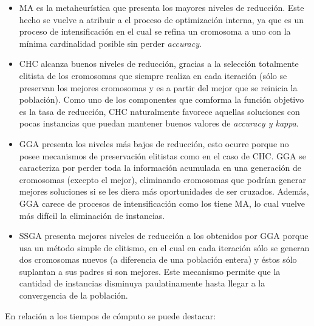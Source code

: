 \begin{itemize}

\item MA es la metaheurística que presenta los mayores niveles de reducción. Este hecho se vuelve a atribuir a el proceso de optimización interna, ya que es un proceso de intensificación en el cual se refina un cromosoma a uno con la mínima cardinalidad posible sin perder \emph{accuracy}.

\item CHC alcanza buenos niveles de reducción, gracias a la selección totalmente elitista de los cromosomas que siempre realiza en cada iteración (sólo se preservan los mejores cromosomas y es a partir del mejor que se reinicia la población). Como uno de los componentes que comforma la función objetivo es la tasa de reducción, CHC naturalmente favorece aquellas soluciones con pocas instancias que puedan mantener buenos valores de \emph{accuracy y kappa}.

\item GGA presenta los niveles más bajos de reducción, esto ocurre porque no posee mecanismos de preservación elitistas como en el caso de CHC. GGA se caracteriza por perder toda la información acumulada en una generación de cromosomas (excepto el mejor), eliminando cromosomas que podrían generar mejores soluciones si se les diera más oportunidades de ser cruzados. Además, GGA carece de procesos de intensificación como los tiene MA, lo cual vuelve más difícil la eliminación de instancias.

\item SSGA presenta mejores niveles de reducción a los obtenidos por GGA porque usa un método simple de elitismo, en el cual en cada iteración sólo se generan dos cromosomas nuevos (a diferencia de una población entera) y éstos sólo suplantan a sus padres si son mejores. Este mecanismo permite que la cantidad de instancias disminuya paulatinamente hasta llegar a la convergencia de la población.

\end{itemize}

En relación a los tiempos de cómputo se puede destacar:

